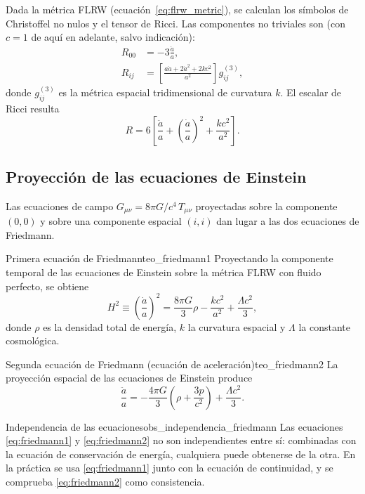 Dada la métrica FLRW (ecuación~\ref{eq:flrw_metric}), se calculan los símbolos de Christoffel no nulos y el tensor de Ricci. Las componentes no triviales son (con $c=1$ de aquí en adelante, salvo indicación):
\begin{align}
  R_{00} &= -3\frac{\ddot a}{a},
  \label{eq:R00}\\[4pt]
  R_{ij} &= \left[\frac{a\ddot a + 2\dot a^2 + 2kc^2}{a^2}\right] g_{ij}^{(3)},
  \label{eq:Rij}
\end{align}
donde $g_{ij}^{(3)}$ es la métrica espacial tridimensional de curvatura $k$. El escalar de Ricci resulta
\begin{equation}
  R = 6\left[\frac{\ddot a}{a} + \left(\frac{\dot a}{a}\right)^2 + \frac{kc^2}{a^2}\right].
  \label{eq:ricci_escalar_flrw}
\end{equation}

\subsection{Proyección de las ecuaciones de Einstein}

Las ecuaciones de campo $G_{\mu\nu}=8\pi G/c^4\,T_{\mu\nu}$ proyectadas sobre la componente $(0,0)$ y sobre una componente espacial $(i,i)$ dan lugar a las dos ecuaciones de Friedmann.

\begin{teorema}{Primera ecuación de Friedmann}{teo_friedmann1}
Proyectando la componente temporal de las ecuaciones de Einstein sobre la métrica FLRW con fluido perfecto, se obtiene
\begin{equation}
  \boxed{H^2 \equiv \left(\frac{\dot a}{a}\right)^2 = \frac{8\pi G}{3}\rho - \frac{kc^2}{a^2} + \frac{\Lambda c^2}{3},}
  \label{eq:friedmann1}
\end{equation}
donde $\rho$ es la densidad total de energía, $k$ la curvatura espacial y $\Lambda$ la constante cosmológica.
\end{teorema}

\begin{teorema}{Segunda ecuación de Friedmann (ecuación de aceleración)}{teo_friedmann2}
La proyección espacial de las ecuaciones de Einstein produce
\begin{equation}
  \boxed{\frac{\ddot a}{a} = -\frac{4\pi G}{3}\left(\rho + \frac{3p}{c^2}\right) + \frac{\Lambda c^2}{3}.}
  \label{eq:friedmann2}
\end{equation}
\end{teorema}

\begin{observacion}{Independencia de las ecuaciones}{obs_independencia_friedmann}
Las ecuaciones \eqref{eq:friedmann1} y \eqref{eq:friedmann2} no son independientes entre sí: combinadas con la ecuación de conservación de energía, cualquiera puede obtenerse de la otra. En la práctica se usa \eqref{eq:friedmann1} junto con la ecuación de continuidad, y se comprueba \eqref{eq:friedmann2} como consistencia.
\end{observacion}

